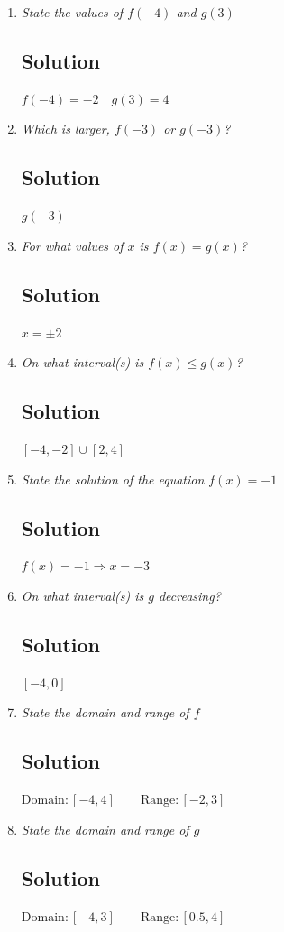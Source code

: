 \documentclass[11pt]{article}
\begin{document}
\begin{enumerate}
	\item \textit{State the values of $f(-4)$ and $g(3)$}
	\subsection*{Solution}
	$f(-4)=-2 \quad g(3)=4$
	
	\item \textit{Which is larger, $f(-3)$ or $g(-3)$?}
	\subsection*{Solution}
	$g(-3)$
	
	\item \textit{For what values of $x$ is $f(x)=g(x)$?}
	\subsection*{Solution}
	$x= \pm 2$
	
	\item \textit{On what interval(s) is $f(x) \leq g(x)$?}
	\subsection*{Solution}
	$[-4,-2] \cup [2,4]$
	
	\item \textit{State the solution of the equation $f(x)=-1$}
	\subsection*{Solution}
	$f(x)=-1 \Rightarrow x=-3$
	
	\item \textit{On what interval(s) is $g$ decreasing?}
	\subsection*{Solution}
	$[-4,0]$
	
	\item \textit{State the domain and range of $f$}
	\subsection*{Solution}
	$\mathrm{Domain}:[-4,4] \qquad\mathrm{Range}:[-2,3]$
	
	\item \textit{State the domain and range of $g$}
	\subsection*{Solution}
	$\mathrm{Domain}:[-4,3] \qquad\mathrm{Range}:[0.5,4]$
\end{enumerate}
\end{document}
